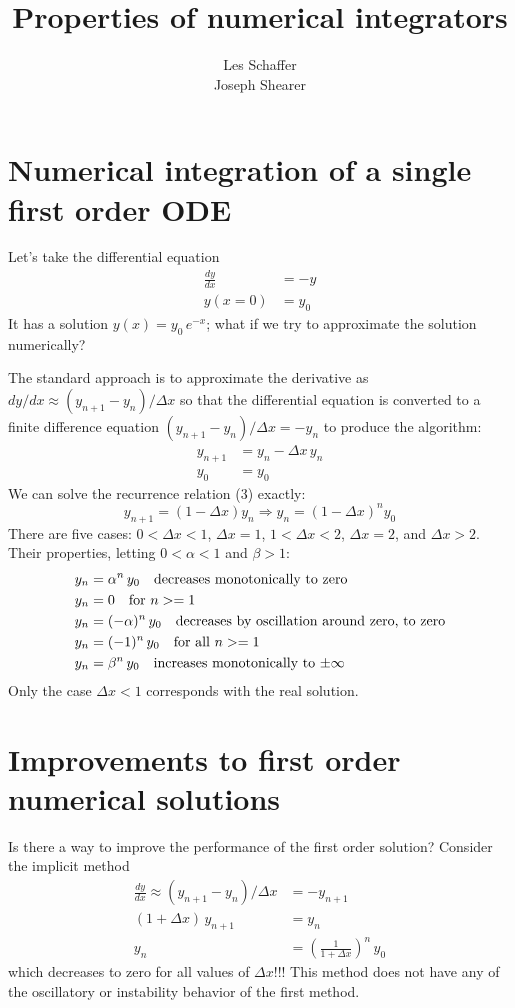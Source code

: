\documentclass[12pt]{article}
\title{Properties of numerical integrators}
\author{Les Schaffer\\ Joseph Shearer}
\begin{document}
\maketitle
\section{Numerical integration of a single first order ODE}
Let's take the differential equation
\begin{align}
\frac{dy}{dx}&=-y\\
y(x=0)&=y_0
\end{align}
It has a solution $y(x) = y_0\, e^{-x}$; what if we try to approximate the solution numerically? 

The standard approach is to approximate the derivative as $dy/dx\approx (y_{n+1} - y_n)/\Delta x$ so that the differential equation is converted to a finite difference equation $(y_{n+1} - y_n)/\Delta x = - y_n$ to produce the algorithm:
\begin{align}
y_{n+1} &= y_n - \Delta x\, y_n\\
y_0 &= y_0
\end{align}
We can solve the recurrence relation (3) exactly:
\begin{equation}
y_{n+1} = (1-\Delta x) y_n \Longrightarrow y_n = (1-\Delta x)^n y_0
\end{equation}
There are five cases: $0<\Delta x<1$, $\Delta x = 1$, $1<\Delta x <2$, $\Delta x = 2$, and $\Delta x > 2$. Their properties, letting $0<\alpha<1$ and $\beta>1$:
\begin{align}
y_n &= \alpha^n\, y_0 \quad\hbox{\rm decreases monotonically to zero}\\
y_n &= 0 \quad \hbox{\rm for $n>=1$}\\
y_n &= (-\alpha)^n\, y_0 \quad\hbox{\rm decreases by oscillation around zero, to zero}\\
y_n &= (-1)^n\, y_0\quad\hbox{\rm for all $n>=1$}\\
y_n &= \beta^n\, y_0\quad\hbox{\rm increases monotonically to  $\pm\infty$}
\end{align}
Only the case $\Delta x < 1$ corresponds with the real solution.

\section{Improvements to first order numerical solutions}
Is there a way to improve the performance of the first order solution? Consider the implicit method
\begin{align}
\frac{dy}{dx} \approx (y_{n+1}-y_n)/\Delta x &= - y_{n+1}\\
(1+\Delta x)\, y_{n+1} &= y_n\\
y_n &= \left(\frac{1}{1+\Delta x}\right)^n\, y_0
\end{align}
which decreases to zero for all values of $\Delta x$!!! This method does not have any of the oscillatory or instability behavior of the first method. 
\end{document}
